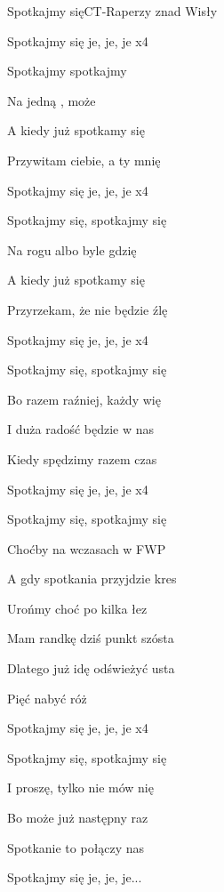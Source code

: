 \documentclass[a4paper,draft]{book}
\begin{document}
\begin{song}{Spotkajmy się}{C}{}{T-Raperzy znad Wisły}{}{}
	\begin{SBChorus}
	Spotkajmy się je, je, je x4
	\end{SBChorus}
	\begin{SBVerse}
	Spotkajmy  spotkajmy 

	Na jedną , może 

	A kiedy już spotkamy się

	Przywitam ciebie, a ty mnię
	\end{SBVerse}
	\begin{SBChorus}
	Spotkajmy się je, je, je x4
	\end{SBChorus}
	\begin{SBVerse}
	Spotkajmy się, spotkajmy się

	Na rogu albo byle gdzię

	A kiedy już spotkamy się

	Przyrzekam, że nie będzie źlę
	\end{SBVerse}
	\begin{SBChorus}
	Spotkajmy się je, je, je x4
	\end{SBChorus}
	\begin{SBVerse}
	Spotkajmy się, spotkajmy się

	Bo razem raźniej, każdy wię

	I duża radość będzie w nas

	Kiedy spędzimy razem czas
	\end{SBVerse}
	\begin{SBChorus}
	Spotkajmy się je, je, je x4
	\end{SBChorus}
	\begin{SBVerse}
	Spotkajmy się, spotkajmy się

	Choćby na wczasach w FWP

	A gdy spotkania przyjdzie kres

	Urońmy choć po kilka łez
	\end{SBVerse}
	\begin{SBVerse}
	Mam randkę dziś punkt szósta

	Dlatego już idę odświeżyć usta

	Pięć nabyć róż
	\end{SBVerse}
	\begin{SBChorus}
	Spotkajmy się je, je, je x4
	\end{SBChorus}
	\begin{SBVerse}
	Spotkajmy się, spotkajmy się

	I proszę, tylko nie mów nię

	Bo może już następny raz

	Spotkanie to połączy nas

	Spotkajmy się je, je, je...
	\end{SBVerse}
\end{song}
\end{document}
